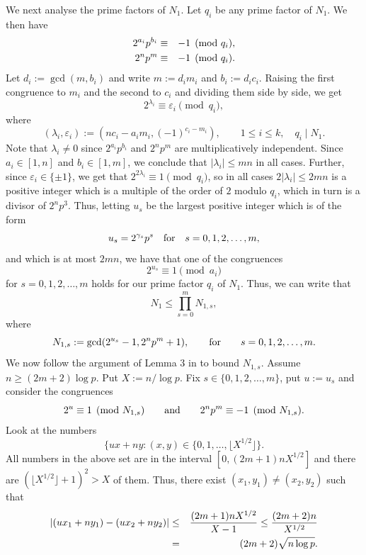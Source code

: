 \documentclass[11pt]{article}
\def\\{\cr}
\begin{document}
We next analyse the prime factors of $N_1$.  Let $q_{i}$ be any prime factor of $N_1$. We then have
\begin{eqnarray*}
2^{a_i}p^{b_i} & \equiv &  -1\pmod {q_i},\\ 
2^np^m & \equiv & -1\pmod {q_i}.
\end{eqnarray*}
Let $d_i:=\gcd(m,b_i)$ and write $m:=d_i m_i$ and $b_i:=d_ic_i$. Raising the first congruence to $m_i$ and the second to $c_i$ and dividing them side by side, we get
\begin{equation}
\label{eq:lambda}
2^{\lambda_{i}}\equiv \varepsilon_{i}\pmod {q_i},
\end{equation}
where 
$$
(\lambda_{i},\varepsilon_{i}):=(nc_i-a_i m_i,(-1)^{c_i-m_i}),\qquad 1\le i\le k,\quad q_i\mid N_1.
$$ 
Note that $\lambda_{i}\ne 0$ since $2^{a_i}p^{b_i}$ and $2^np^m$ are multiplicatively independent. Since $a_i\in [1,n]$ and $b_i\in [1,m]$, we conclude that $|\lambda_{i}|\le mn$ in all cases. Further, 
since $\varepsilon_{i}\in \{\pm 1\}$, we get that $2^{2\lambda_{i}}\equiv 1\pmod {q_i}$, so in all cases $2|\lambda_{i}|\le 2mn$ is a positive integer which is a multiple of the order of $2$ modulo $q_i$, which in turn is a divisor of $2^np^3$. 
Thus, letting $u_s$ be the largest positive integer which is of the form 
$$
u_s=2^{\gamma_s} p^s\quad {\text{\rm for}}\quad s=0,1,2,\ldots,m,
$$
and which is at most $2mn$, we have that one of the congruences 
$$
2^{u_s}\equiv 1\pmod {a_i}
$$
for $s=0,1,2,\ldots,m$ holds for our prime factor $q_i$ of $N_1$. Thus, we can write that 
$$
N_1\le \prod_{s=0}^m N_{1,s},
$$
where 
$$
N_{1,s}:=\gcd(2^{u_s}-1,2^np^m+1),\qquad {\text{\rm for}}\qquad s=0,1,2,\ldots,m.
$$ 
We now follow the argument of Lemma 3 in \cite{CLP} to bound $N_{1,s}$. Assume $n\ge (2m+2)\log p$. Put $X:=n/\log p$. Fix $s\in \{0,1,2,\ldots,m\}$, put $u:=u_s$ and consider the congruences
\begin{equation}
\label{eq:2}
2^u\equiv 1\pmod {N_{1,s}}\qquad {\text{\rm and}}\qquad 2^n p^m\equiv -1\pmod {N_{1,s}}.
\end{equation}
Look at the numbers 
$$
\{ux+ny: (x,y)\in \{0,1,\ldots,\lfloor X^{1/2}\rfloor\}.
$$
All numbers in the above set are in the interval $[0,(2m+1)nX^{1/2}]$ and there are $(\lfloor X^{1/2}\rfloor +1)^2>X$ of them. Thus, there exist $(x_1,y_1)\ne (x_2,y_2)$ such that 
\begin{eqnarray*}
|(ux_1+ny_1)-(ux_2+ny_2)| & \le &  \frac{(2m+1)nX^{1/2}}{X-1}\le \frac{(2m+2)n}{X^{1/2}}\\
& = & (2m+2){\sqrt{n\log p}}.
\end{eqnarray*}
\end{document}
